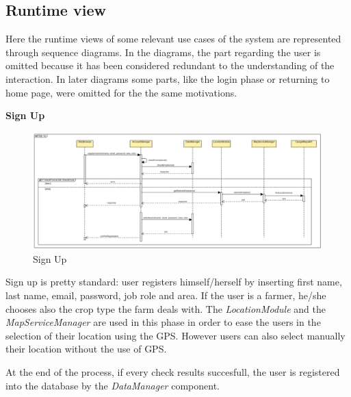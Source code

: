 \documentclass[table, 12pt]{article}
\begin{document}
\subsection{Runtime view}

Here the runtime views of some relevant use cases of the system are represented through sequence diagrams. 
In the diagrams, the part regarding the user is omitted because it has been considered redundant to the understanding of the interaction.
In later diagrams some parts, like the login phase or returning to home page, were omitted for the the same motivations.

\newpage
\textbf{Sign Up}
\begin{center}
    \begin{figure}[H]
        \includegraphics[scale=0.4, center]{assets/SequenceDiagram/SignUp.png}
        \caption{Sign Up}
        \label{fig:signup}
    \end{figure}
\end{center}
Sign up is pretty standard: user registers himself/herself by inserting first name, last name, email, password, job role and area. If the user is a farmer, he/she chooses also the crop type the farm deals with.
The \textit{LocationModule} and the \textit{MapServiceManager} are used in this phase in order to ease the users in the selection of their location using the GPS. 
However users can also select manually their location without the use of GPS.

At the end of the process, if every check results succesfull, the user is registered into the database by the \textit{DataManager} component.
\end{document}
